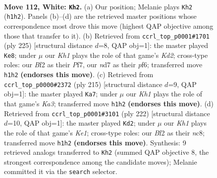\documentclass[11pt]{article}
\begin{document}
\clearpage

\begin{figure}[p]\centering
\begin{subfigure}{0.46\textwidth}\centering
\resizebox{\linewidth}{!}{%
\newchessgame
\chessboard[
  setfen={6k1/3n4/8/5P2/p7/P6P/5B2/7K w - - 43 112},
  showmover=false,
  pgfstyle=straightmove, color=movearrow, markmove={h1-h2}
]}
\caption{}
\end{subfigure}\hfill
\begin{subfigure}{0.46\textwidth}\centering
\resizebox{\linewidth}{!}{%
\newchessgame
\chessboard[
  setfen={8/3k1p1p/5P1P/3K4/8/5p2/5B2/8 b - - 55 113},
  showmover=false,
  pgfstyle=straightmove, color=movearrow, markmove={d7-e8}
]}
\caption{}
\end{subfigure}
\\[4pt]
\begin{subfigure}{0.46\textwidth}\centering
\resizebox{\linewidth}{!}{%
\newchessgame
\chessboard[
  setfen={8/6b1/k7/8/2K5/p4N2/P7/8 b - - 73 108},
  showmover=false,
  pgfstyle=straightmove, color=movearrow, markmove={a6-a7}
]}
\caption{}
\end{subfigure}\hfill
\begin{subfigure}{0.46\textwidth}\centering
\resizebox{\linewidth}{!}{%
\newchessgame
\chessboard[
  setfen={2n5/5k2/8/8/7p/7P/6P1/4K3 w - - 0 112},
  showmover=false,
  pgfstyle=straightmove, color=movearrow, markmove={e1-d2}
]}
\caption{}
\end{subfigure}
\caption{\textbf{Move 112, White: \texttt{Kh2}.} (a) Our position; Melanie plays \texttt{Kh2} (\texttt{h1h2}). Panels (b)--(d) are the retrieved master positions whose correspondence most drove this move (highest QAP objective among those that transfer to it). (b) Retrieved from \texttt{ccrl\_top\_p0001\#1701} (ply 225) [structural distance $d$=8, QAP obj=1]: the master played \texttt{Ke8}; under $\mu$ our \emph{Kh1} plays the role of that game's \emph{Kd2}; cross-type roles: our \emph{B}f2 as their \emph{P}f7, our \emph{n}d7 as their \emph{p}f6; transferred move \texttt{h1h2} \textbf{(endorses this move)}. (c) Retrieved from \texttt{ccrl\_top\_p0000\#2372} (ply 215) [structural distance $d$=9, QAP obj=1]: the master played \texttt{Ka7}; under $\mu$ our \emph{Kh1} plays the role of that game's \emph{Ka3}; transferred move \texttt{h1h2} \textbf{(endorses this move)}. (d) Retrieved from \texttt{ccrl\_top\_p0001\#3101} (ply 222) [structural distance $d$=10, QAP obj=1]: the master played \texttt{Kd2}; under $\mu$ our \emph{Kh1} plays the role of that game's \emph{Ke1}; cross-type roles: our \emph{B}f2 as their \emph{n}c8; transferred move \texttt{h1h2} \textbf{(endorses this move)}. Synthesis: 9 retrieved analogs transferred to \texttt{Kh2} (summed QAP objective 8, the strongest correspondence among the candidate moves); Melanie committed it via the \texttt{search} selector.}
\label{fig:thought-m222}
\end{figure}
\end{document}

